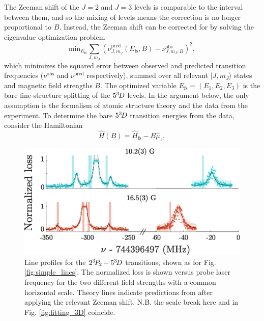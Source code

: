 	The Zeeman shift of the $J=2$ and $J=3$ levels is comparable to the interval between them, and so the mixing of levels means the correction is no longer proportional to $B$.
	Instead, the Zeeman shift can be corrected for by solving the eigenvalue optimization problem 
%
\begin{equation}
\textrm{min}_{E_{\textrm{fs}}} \sum_{J,m_J} \left(\nu_{{J,m_J}}^{\textrm{{pred}}}(E_{\textrm{fs}},B) - \nu_{{J,m_J,B}}^{\textrm{{obs}}}\right)^2,
\label{eqn:opt-problem}
\end{equation}
%
which minimizes the squared error between observed and predicted transition frequencies ($\nu^{\textrm{{obs}}}$ and $\nu^{{\textrm{pred}}}$ respectively), summed over all relevant $|J,m_J\rangle$ states and magnetic field strengths $B$.
	The optimized variable $E_{\textrm{fs}}=(E_1,E_2,E_3)$ is the bare fine-structure splitting of the $5^{3\!} D$ levels.
	In the argument below, the only assumption is the formalism of atomic structure theory and the data from the experiment.
	To determine the bare $5^{3\!} D$ transition energies from the data, consider the Hamiltonian
%
\begin{equation}
    \hat{H}(B) = \hat{H}_{\textrm{fs}} - B\hat{\mu}_z,
    \label{eqn:hamiltonian}
\end{equation}
%

\begin{figure}
	\centering
	\includegraphics[width=\textwidth]{fig/spectroscopy/ci-plot-53D}
   \caption{Line profiles for the $2^{3\!}P_2 -  5^{3\!}D$ transitions, shown as for Fig.
	\ref{fig:simple_lines}.
	The normalized loss is shown versus probe laser frequency for the two different field strengths with a common horizontal scale.
	Theory lines indicate predictions from \cite{Drake07} after applying the relevant Zeeman shift.
	N.B.	the scale break here and in Fig.	\ref{fig:fitting_3D} coincide.}
    \label{fig:combined_5D_lines}
\end{figure}

